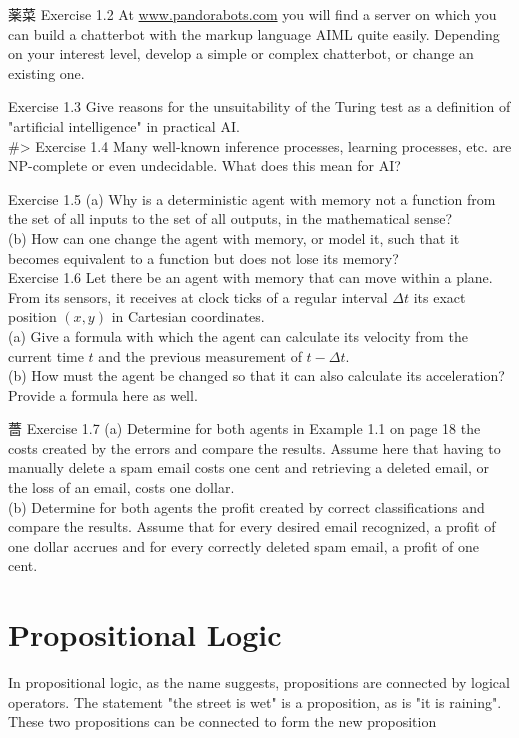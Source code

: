\documentclass[10pt]{book}
\begin{document}
薬菜 Exercise 1.2 At \href{http://www.pandorabots.com}{www.pandorabots.com} you will find a server on which you can build a chatterbot with the markup language AIML quite easily. Depending on your interest level, develop a simple or complex chatterbot, or change an existing one.

Exercise 1.3 Give reasons for the unsuitability of the Turing test as a definition of "artificial intelligence" in practical AI.\\

\#> Exercise 1.4 Many well-known inference processes, learning processes, etc. are NP-complete or even undecidable. What does this mean for AI?

Exercise 1.5
(a) Why is a deterministic agent with memory not a function from the set of all inputs to the set of all outputs, in the mathematical sense?\\
(b) How can one change the agent with memory, or model it, such that it becomes equivalent to a function but does not lose its memory?\\
Exercise 1.6 Let there be an agent with memory that can move within a plane. From its sensors, it receives at clock ticks of a regular interval $\Delta t$ its exact position $(x, y)$ in Cartesian coordinates.\\
(a) Give a formula with which the agent can calculate its velocity from the current time $t$ and the previous measurement of $t-\Delta t$.\\
(b) How must the agent be changed so that it can also calculate its acceleration? Provide a formula here as well.

薔 Exercise 1.7
(a) Determine for both agents in Example 1.1 on page 18 the costs created by the errors and compare the results. Assume here that having to manually delete a spam email costs one cent and retrieving a deleted email, or the loss of an email, costs one dollar.\\
(b) Determine for both agents the profit created by correct classifications and compare the results. Assume that for every desired email recognized, a profit of one dollar accrues and for every correctly deleted spam email, a profit of one cent.

\chapter{Propositional Logic}
In propositional logic, as the name suggests, propositions are connected by logical operators. The statement "the street is wet" is a proposition, as is "it is raining". These two propositions can be connected to form the new proposition\\
\end{document}
